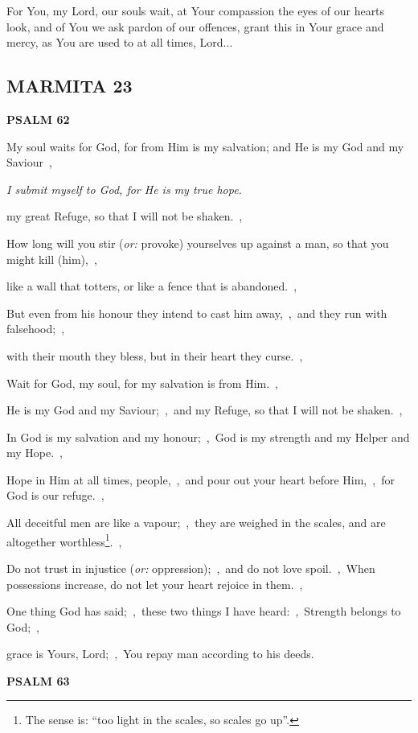 \documentclass[12pt,twoside,a5paper]{article}
\newcommand{\marmita}[1]{\subsection*{MARMITA {#1}}}
\newcommand{\psalm}[1]{\textbf{PSALM {#1}}\nopagebreak}
\newcommand{\qanona}[1]{{\liturgicalhint{Qanona.} \emph{#1}}}
\newcommand{\slota}[1]{\liturgicalhint{Slota.} #1}
\newcommand{\translationoption}[1]{\emph{or:} #1}
\begin{document}
\slota{For You, my Lord, our souls wait, at Your compassion the eyes of our hearts look, and of You we ask pardon of our offences, grant this in Your grace and mercy, as You are used to at all times, Lord...}

\marmita{23}

\psalm{62}

\begin{normalparskip}
  My soul waits for God, for from Him is my salvation; and He is my God and my Saviour~\sep

  \qanona{I submit myself to God, for He is my true hope.}

  my great Refuge, so that I will not be shaken.~\sep

  How long will you stir (\translationoption{provoke}) yourselves up against a man, so that you might kill (him),~\sep

  like a wall that totters, or like a fence that is abandoned.~\sep

  But even from his honour they intend to cast him away,~\sep\ and they run with falsehood;~\sep

  with their mouth they bless, but in their heart they curse.~\sep

  Wait for God, my soul, for my salvation is from Him.~\sep

  He is my God and my Saviour;~\sep\ and my Refuge, so that I will not be shaken.~\sep

  In God is my salvation and my honour;~\sep\ God is my strength and my Helper and my Hope.~\sep

  Hope in Him at all times, people,~\sep\ and pour out your heart before Him,~\sep\ for God is our refuge.~\sep

  All deceitful men are like a vapour;~\sep\ they are weighed in the scales, and are altogether worthless\footnote{The sense is: ``too light in the scales, so scales go up''.}.~\sep

  Do not trust in injustice (\translationoption{oppression});~\sep\ and do not love spoil.~\sep\ When possessions increase, do not let your heart rejoice in them.~\sep

  One thing God has said;~\sep\ these two things I have heard:~\sep\ Strength belongs to God;~\sep

  grace is Yours, Lord;~\sep\ You repay man according to his deeds.
\end{normalparskip}

\psalm{63}
\end{document}
